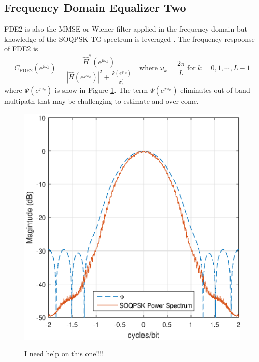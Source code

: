 \subsection{Frequency Domain Equalizer Two}
FDE2 is also the MMSE or Wiener filter applied in the frequency domain but knowledge of the SOQPSK-TG spectrum is leveraged \cite[eq. (12)]{williams2013linear}.
The frequency respoonse of FDE2 is
\begin{equation}
C_\text{FDE2}(e^{j\omega_k}) = \frac{\hat{H}^\ast(e^{j\omega_k})}  {|\hat{H}(e^{j\omega_k})|^2  +  \frac{\Psi(e^{j\omega_k})}{\hat{\sigma}^2_w}} \quad
\text{where} \;
\omega_k = \frac{2\pi}{L} \;
\text{for} \;
k=0,1,\cdots,L-1
\label{eq:FDE2}
\end{equation}
where $\Psi(e^{j\omega_k})$ is show in Figure \ref{fig:SOQPSK_spectrum}.
The term $\Psi(e^{j\omega_k})$ eliminates out of band multipath that may be challenging to estimate and over come.
\begin{figure}
	\centering\includegraphics[width=5in]{figures/eq_equations/FDE2_spectrum_PSI.eps}
	\label{fig:SOQPSK_spectrum}
	\caption{I need help on this one!!!! }
\end{figure}
